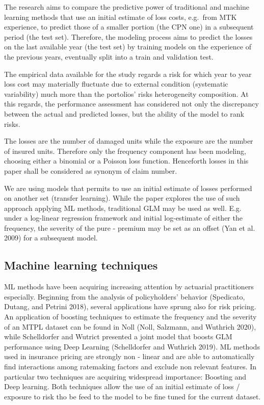 \documentclass[
]{article}
\begin{document}
The research aims to compare the predictive power of traditional and
machine learning methods that use an initial estimate of loss costs,
e.g.~from MTK experience, to predict those of a smaller portion (the CPN
one) in a subsequent period (the test set). Therefore, the modeling
process aims to predict the losses on the last available year (the test
set) by training models on the experience of the previous years,
eventually split into a train and validation test.

The empirical data available for the study regards a risk for which year
to year loss cost may materially fluctuate due to external condition
(systematic variability) much more than the portolios' risks
heterogeneity composition. At this regards, the performance assessment
has considered not only the discrepancy between the actual and predicted
losses, but the ability of the model to rank risks.

The losses are the number of damaged units while the exposure are the
number of insured units. Therefore only the frequency component has been
modeling, choosing either a binomial or a Poisson loss function.
Henceforth losses in this paper shall be considered as synonym of claim
number.

We are using models that permits to use an initial estimate of losses
performed on another set (transfer learning). While the paper explores
the use of such approach applying ML methods, traditional GLM may be
used as well. E.g. under a log-linear regression framework and initial
log-estimate of either the frequency, the severity of the pure - premium
may be set as an offset (Yan et al. 2009) for a subsequent model.

\hypertarget{machine-learning-techniques}{%
\subsection{Machine learning
techniques}\label{machine-learning-techniques}}

ML methods have been acquiring increasing attention by actuarial
practitioners especially. Beginning from the analysis of policyholders'
behavior (Spedicato, Dutang, and Petrini 2018), several applications
have sprung also for risk pricing. An application of boosting techniques
to estimate the frequency and the severity of an MTPL dataset can be
found in Noll (Noll, Salzmann, and Wuthrich 2020), while Schelldorfer
and Wutrict presented a joint model that boosts GLM performance using
Deep Learning (Schelldorfer and Wuthrich 2019). ML methods used in
insurance pricing are strongly non - linear and are able to
automatically find interactions among ratemaking factors and exclude non
relevant features. In particular two techniques are acquiring widespread
importance: Boosting and Deep learning. Both techniques allow the use of
an initial estimate of loss / exposure to risk tho be feed to the model
to be fine tuned for the current dataset.
\end{document}

